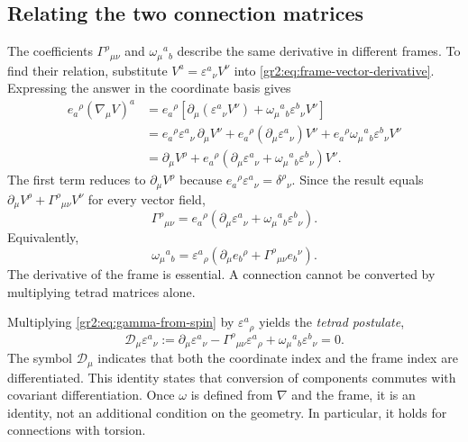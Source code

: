 \documentclass[11pt,a4paper]{article}
\numberwithin{equation}{section}
\begin{document}
\subsection{Relating the two connection matrices}

The coefficients \(\Gamma^\rho{}_{\mu\nu}\) and
\(\omega_\mu{}^a{}_b\) describe the same derivative in different
frames. To find their relation, substitute
\(V^a=\varepsilon^a{}_\nu V^\nu\) into
\eqref{gr2:eq:frame-vector-derivative}. Expressing the answer in the
coordinate basis gives
\begin{align*}
 e_a{}^\rho(\nabla_\mu V)^a
 &=e_a{}^\rho\left[
 \partial_\mu(\varepsilon^a{}_\nu V^\nu)
 +\omega_\mu{}^a{}_b\varepsilon^b{}_\nu V^\nu\right]\\
 &=e_a{}^\rho\varepsilon^a{}_\nu\,\partial_\mu V^\nu
 +e_a{}^\rho(\partial_\mu\varepsilon^a{}_\nu)V^\nu
 +e_a{}^\rho\omega_\mu{}^a{}_b\varepsilon^b{}_\nu V^\nu\\
 &=\partial_\mu V^\rho+
 e_a{}^\rho\left(
 \partial_\mu\varepsilon^a{}_\nu
 +\omega_\mu{}^a{}_b\varepsilon^b{}_\nu\right)V^\nu.
\end{align*}
The first term reduces to \(\partial_\mu V^\rho\) because
\(e_a{}^\rho\varepsilon^a{}_\nu=\delta^\rho{}_\nu\).
Since the result equals \(\partial_\mu V^\rho+
\Gamma^\rho{}_{\mu\nu}V^\nu\) for every vector field,
\begin{equation}
 \Gamma^\rho{}_{\mu\nu}
 =e_a{}^\rho\left(
 \partial_\mu\varepsilon^a{}_\nu
 +\omega_\mu{}^a{}_b\varepsilon^b{}_\nu\right).
 \label{gr2:eq:gamma-from-spin}
\end{equation}
Equivalently,
\begin{equation}
 \omega_\mu{}^a{}_b
 =\varepsilon^a{}_\rho\left(
 \partial_\mu e_b{}^\rho+
 \Gamma^\rho{}_{\mu\nu}e_b{}^\nu\right).
 \label{gr2:eq:spin-from-gamma}
\end{equation}
The derivative of the frame is essential. A connection cannot be
converted by multiplying tetrad matrices alone.

Multiplying \eqref{gr2:eq:gamma-from-spin} by
\(\varepsilon^a{}_\rho\) yields the \emph{tetrad postulate},
\begin{equation}
 \mathcal D_\mu\varepsilon^a{}_\nu
 :=\partial_\mu\varepsilon^a{}_\nu
   -\Gamma^\rho{}_{\mu\nu}\varepsilon^a{}_\rho
   +\omega_\mu{}^a{}_b\varepsilon^b{}_\nu=0.
 \label{gr2:eq:tetrad-postulate}
\end{equation}
The symbol \(\mathcal D_\mu\) indicates that both the coordinate
index and the frame index are differentiated. This identity states
that conversion of components commutes with covariant
differentiation. Once \(\omega\) is defined from \(\nabla\) and the
frame, it is an identity, not an additional condition on the geometry.
In particular, it holds for connections with torsion.
\end{document}
